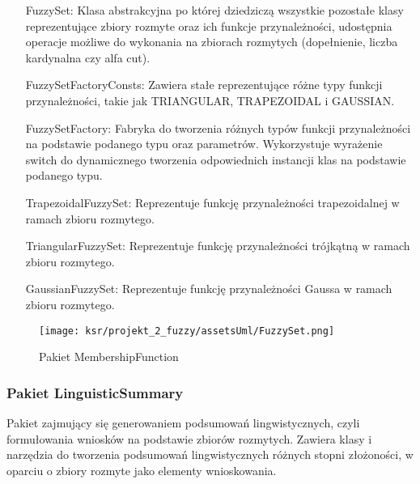 \documentclass{article}
\begin{document}
\begin{itemize}
    \item[FuzzySet:] Klasa abstrakcyjna po której dziedziczą wszystkie pozostałe klasy reprezentujące zbiory rozmyte oraz ich funkcje przynależności, udostępnia operacje możliwe do wykonania na zbiorach rozmytych (dopełnienie, liczba kardynalna czy alfa cut).
    \item[FuzzySetFactoryConsts:] Zawiera stałe reprezentujące różne typy funkcji przynależności, takie jak TRIANGULAR, TRAPEZOIDAL i GAUSSIAN.
    \item[FuzzySetFactory:] Fabryka do tworzenia różnych typów funkcji przynależności na podstawie podanego typu oraz parametrów.
    Wykorzystuje wyrażenie switch do dynamicznego tworzenia odpowiednich instancji klas na podstawie podanego typu.
    \item[TrapezoidalFuzzySet:] Reprezentuje funkcję przynależności trapezoidalnej w ramach zbioru rozmytego.
    \item[TriangularFuzzySet:] Reprezentuje funkcję przynależności trójkątną w ramach zbioru rozmytego.
    \item[GaussianFuzzySet:] Reprezentuje funkcję przynależności Gaussa w ramach zbioru rozmytego.
\end{itemize}

\begin{figure}[H]
\centering
\texttt{[image: ksr/projekt\_2\_fuzzy/assetsUml/FuzzySet.png]}
\caption{Pakiet MembershipFunction}
\label{fig:epsilon_bat}
\end{figure}

\subsubsection{Pakiet LinguisticSummary}

\noindent Pakiet zajmujący się generowaniem podsumowań lingwistycznych, czyli formułowania wniosków na podstawie zbiorów rozmytych. Zawiera klasy i narzędzia do tworzenia podsumowań lingwistycznych różnych stopni złożoności, w oparciu o zbiory rozmyte jako elementy wnioskowania.
\end{document}
